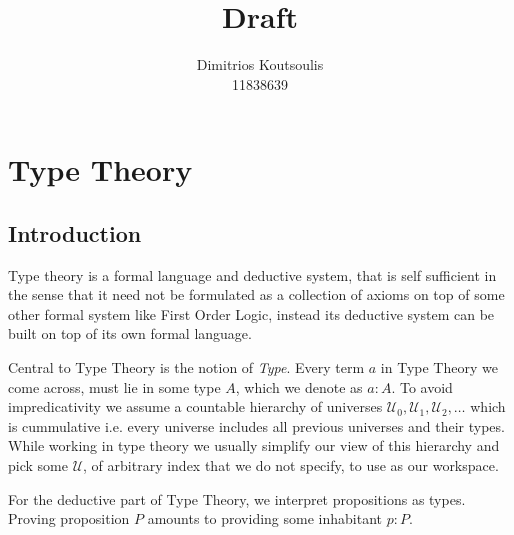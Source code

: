 \documentclass[12pt]{report}
\begin{document}
 
\title{Draft}%
\author{Dimitrios Koutsoulis\\ %
11838639} %
 
\begin{titlepage}
\hypersetup{pageanchor=false}
\maketitle
\thispagestyle{empty}
\end{titlepage}
\hypersetup{pageanchor=true}
\chapter{Type Theory}
\section{Introduction}
Type theory is a formal language and deductive system, that is self sufficient in the sense that it need not be formulated as a collection of axioms on top of some other formal system like First Order Logic, instead its deductive system can be built on top of its own formal language. 

Central to Type Theory is the notion of \textit{Type}. Every term $a$ in Type Theory we come across, must lie in some type $A$, which we denote as $a : A$. 
To avoid impredicativity we assume a countable hierarchy of universes $\mathcal{U}_0,\mathcal{U}_1,\mathcal{U}_2,\ldots$ which is cummulative i.e. every universe includes all previous universes and their types. 
While working in type theory we usually simplify our view of this hierarchy and pick some $\mathcal{U}$, of arbitrary index that we do not specify, to use as our workspace. 

For the deductive part of Type Theory, we interpret propositions as types. Proving proposition $P$ amounts to providing some inhabitant $p : P$. 
\end{document}
